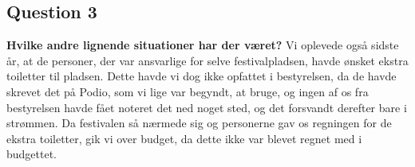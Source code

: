 \subsection{Question 3}
\label{sub:i4q3}
\noindent \textbf{Hvilke andre lignende situationer har der været?}
Vi oplevede også sidste år, at de personer, der var ansvarlige for selve festivalpladsen, havde
ønsket ekstra toiletter til pladsen. Dette havde vi dog ikke opfattet i bestyrelsen, da de havde
skrevet det på Podio, som vi lige var begyndt, at bruge, og ingen af os fra bestyrelsen havde fået
noteret det ned noget sted, og det forsvandt derefter bare i strømmen. Da festivalen så nærmede sig
og personerne gav os regningen for de ekstra toiletter, gik vi over budget, da dette ikke var blevet
regnet med i budgettet.
